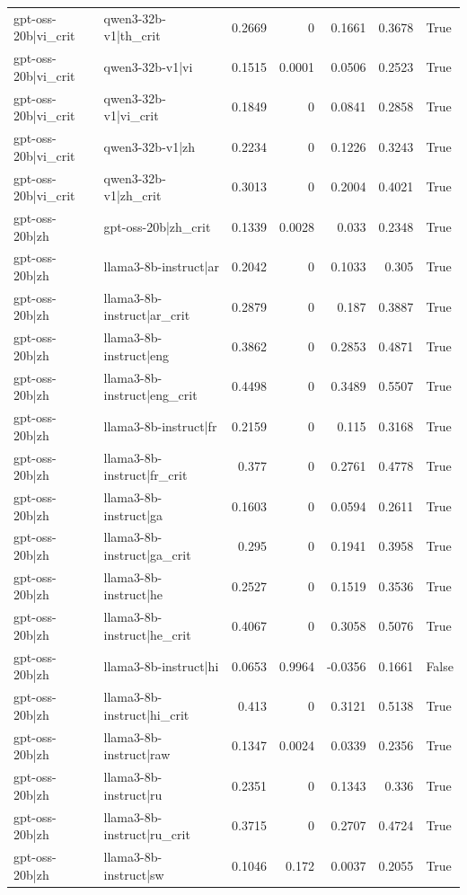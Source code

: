 \begin{table}
\begin{tabular}{l l r r r r l}
gpt-oss-20b|vi_crit & qwen3-32b-v1|th_crit & 0.2669 & 0 & 0.1661 & 0.3678 & True \\
gpt-oss-20b|vi_crit & qwen3-32b-v1|vi & 0.1515 & 0.0001 & 0.0506 & 0.2523 & True \\
gpt-oss-20b|vi_crit & qwen3-32b-v1|vi_crit & 0.1849 & 0 & 0.0841 & 0.2858 & True \\
gpt-oss-20b|vi_crit & qwen3-32b-v1|zh & 0.2234 & 0 & 0.1226 & 0.3243 & True \\
gpt-oss-20b|vi_crit & qwen3-32b-v1|zh_crit & 0.3013 & 0 & 0.2004 & 0.4021 & True \\
gpt-oss-20b|zh & gpt-oss-20b|zh_crit & 0.1339 & 0.0028 & 0.033 & 0.2348 & True \\
gpt-oss-20b|zh & llama3-8b-instruct|ar & 0.2042 & 0 & 0.1033 & 0.305 & True \\
gpt-oss-20b|zh & llama3-8b-instruct|ar_crit & 0.2879 & 0 & 0.187 & 0.3887 & True \\
gpt-oss-20b|zh & llama3-8b-instruct|eng & 0.3862 & 0 & 0.2853 & 0.4871 & True \\
gpt-oss-20b|zh & llama3-8b-instruct|eng_crit & 0.4498 & 0 & 0.3489 & 0.5507 & True \\
gpt-oss-20b|zh & llama3-8b-instruct|fr & 0.2159 & 0 & 0.115 & 0.3168 & True \\
gpt-oss-20b|zh & llama3-8b-instruct|fr_crit & 0.377 & 0 & 0.2761 & 0.4778 & True \\
gpt-oss-20b|zh & llama3-8b-instruct|ga & 0.1603 & 0 & 0.0594 & 0.2611 & True \\
gpt-oss-20b|zh & llama3-8b-instruct|ga_crit & 0.295 & 0 & 0.1941 & 0.3958 & True \\
gpt-oss-20b|zh & llama3-8b-instruct|he & 0.2527 & 0 & 0.1519 & 0.3536 & True \\
gpt-oss-20b|zh & llama3-8b-instruct|he_crit & 0.4067 & 0 & 0.3058 & 0.5076 & True \\
gpt-oss-20b|zh & llama3-8b-instruct|hi & 0.0653 & 0.9964 & -0.0356 & 0.1661 & False \\
gpt-oss-20b|zh & llama3-8b-instruct|hi_crit & 0.413 & 0 & 0.3121 & 0.5138 & True \\
gpt-oss-20b|zh & llama3-8b-instruct|raw & 0.1347 & 0.0024 & 0.0339 & 0.2356 & True \\
gpt-oss-20b|zh & llama3-8b-instruct|ru & 0.2351 & 0 & 0.1343 & 0.336 & True \\
gpt-oss-20b|zh & llama3-8b-instruct|ru_crit & 0.3715 & 0 & 0.2707 & 0.4724 & True \\
gpt-oss-20b|zh & llama3-8b-instruct|sw & 0.1046 & 0.172 & 0.0037 & 0.2055 & True \\

\end{tabular}
\end{table}
